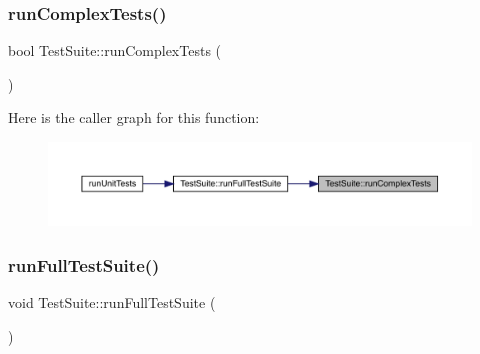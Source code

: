\subsubsection{\texorpdfstring{runComplexTests()}{runComplexTests()}}
{\footnotesize\ttfamily bool Test\+Suite\+::run\+Complex\+Tests (\begin{DoxyParamCaption}{ }\end{DoxyParamCaption})}

Here is the caller graph for this function\+:\nopagebreak
\begin{figure}[H]
\begin{center}
\leavevmode
\includegraphics[width=350pt]{class_test_suite_a0597dcd7c68390ac33d8095f2a76ae0f_icgraph}
\end{center}
\end{figure}
\mbox{\label{class_test_suite_a0fa7e788a1b1c235faa475c0d1aaa1e3}} 
\subsubsection{\texorpdfstring{runFullTestSuite()}{runFullTestSuite()}}
{\footnotesize\ttfamily void Test\+Suite\+::run\+Full\+Test\+Suite (\begin{DoxyParamCaption}{ }\end{DoxyParamCaption})}


